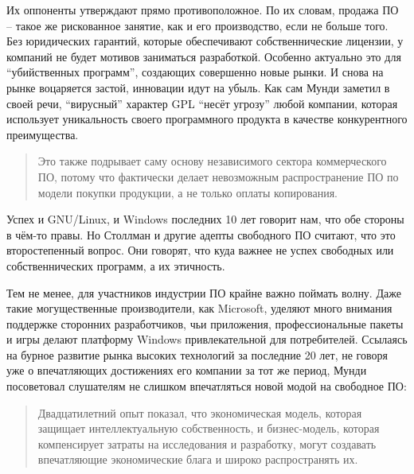 Их оппоненты утверждают прямо противоположное. По их словам, продажа ПО -- такое же рискованное занятие, как и его производство, если не больше того. Без юридических гарантий, которые обеспечивают собственнические лицензии, у компаний не будет мотивов заниматься разработкой. Особенно актуально это для ``убийственных программ'', создающих совершенно новые рынки.  И снова на рынке воцаряется застой, инновации идут на убыль. Как сам Мунди заметил в своей речи, ``вирусный'' характер GPL ``несёт угрозу'' любой компании, которая использует уникальность своего программного продукта в качестве конкурентного преимущества. 

\begin{quote}
Это также подрывает саму основу независимого сектора коммерческого ПО, потому что фактически делает невозможным распространение ПО по модели покупки продукции, а не только оплаты копирования.
\end{quote}

Успех и GNU/Linux, и Windows последних 10 лет говорит нам, что обе стороны в чём-то правы. Но Столлман и другие адепты свободного ПО считают, что это второстепенный вопрос. Они говорят, что куда важнее не успех свободных или собственнических программ, а их этичность.

Тем не менее, для участников индустрии ПО крайне важно поймать волну. Даже такие могущественные производители, как Microsoft, уделяют много внимания поддержке сторонних разработчиков, чьи приложения, профессиональные пакеты и игры делают платформу Windows привлекательной для потребителей. Ссылаясь на бурное развитие рынка высоких технологий за последние 20 лет, не говоря уже о впечатляющих достижениях его компании за тот же период, Мунди посоветовал слушателям не слишком впечатляться новой модой на свободное ПО:

\begin{quote}
Двадцатилетний опыт показал, что экономическая модель, которая защищает интеллектуальную собственность, и бизнес-модель, которая компенсирует затраты на исследования и разработку, могут создавать впечатляющие экономические блага и широко распространять их.
\end{quote}

